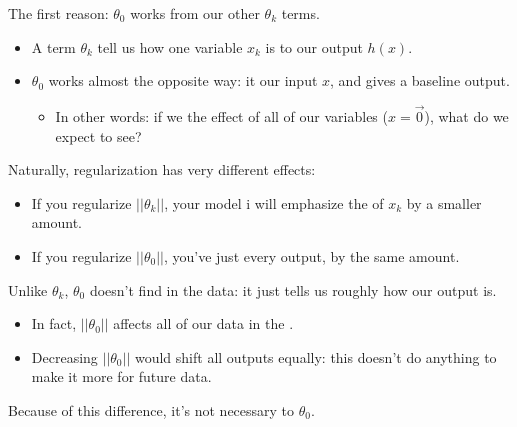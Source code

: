         The first reason: $\theta_0$ works  from our other $\theta_k$ terms.

        \begin{itemize}
            \item A term $\theta_k$ tell us how  one variable $x_k$ is to our output $h(x)$.

            \item $\theta_0$ works almost the opposite way: it  our input $x$, and gives a baseline output.

                \begin{itemize}
                    \item In other words: if we  the effect of all of our variables ($x=\vec{0}$), what do we expect to see?
                \end{itemize}
        \end{itemize}

        Naturally, regularization has very different effects:

        \begin{itemize}
            \item If you regularize $||\theta_k||$, your model i will emphasize the  of $x_k$ by a smaller amount. 
            
            \item If you regularize $||\theta_0||$, you've just  every output, by the same amount.\\
        \end{itemize}

        \begin{concept}
            Unlike $\theta_k$, $\theta_0$ doesn't find  in the data: it just tells us roughly how  our output is.

            \begin{itemize}
                \item In fact, $||\theta_0||$ affects all of our data in the .

                \item Decreasing $||\theta_0||$ would shift all outputs equally: this doesn't do anything to make it more  for future data.
            \end{itemize}

            Because of this difference, it's not necessary to  $\theta_0$.
        \end{concept}

